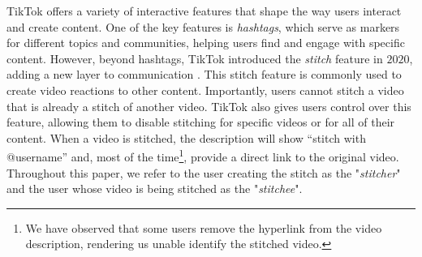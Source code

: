 TikTok offers a variety of interactive features that shape the way users interact and create content. One of the key features is \textit{hashtags}, which serve as markers for different topics and communities, helping users find and engage with specific content. However, beyond hashtags, TikTok introduced the \textit{stitch} feature in $2020$, adding a new layer to communication \citep{introducingStitch}. This stitch feature is commonly used to create video reactions to other content. Importantly, users cannot stitch a video that is already a stitch of another video. TikTok also gives users control over this feature, allowing them to disable stitching for specific videos or for all of their content. When a video is stitched, the description will show “stitch with @username” and, most of the time\footnote{We have observed that some users remove the hyperlink from the video description, rendering us unable identify the stitched video.}, provide a direct link to the original video. Throughout this paper, we refer to the user creating the stitch as the "\textit{stitcher}" and the user whose video is being stitched as the "\textit{stitchee}".
